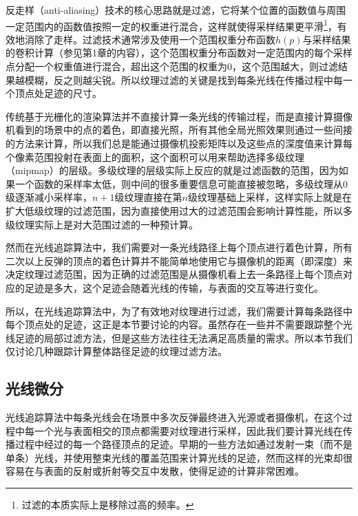 反走样（anti-aliasing）技术的核心思路就是过滤，它将某个位置的函数值与周围一定范围内的函数值按照一定的权重进行混合，这样就使得采样结果更平滑\footnote{过滤的本质实际上是移除过高的频率。}，有效地消除了走样。过滤技术通常涉及使用一个范围权重分布函数$h(p)$与采样结果的卷积计算（参见第1章的内容），这个范围权重分布函数对一定范围内的每个采样点分配一个权重值进行混合，超出这个范围的权重为0，这个范围越大，则过滤结果越模糊，反之则越尖锐。所以纹理过滤的关键是找到每条光线在传播过程中每一个顶点处足迹的尺寸。

传统基于光栅化的渲染算法并不直接计算一条光线的传输过程，而是直接计算摄像机看到的场景中的点的着色，即直接光照，所有其他全局光照效果则通过一些间接的方法来计算，所以我们总是能通过摄像机投影矩阵以及这些点的深度值来计算每个像素范围投射在表面上的面积，这个面积可以用来帮助选择多级纹理（mipmap）的层级。多级纹理的层级实际上反应的就是过滤函数的范围，因为如果一个函数的采样率太低，则中间的很多重要信息可能直接被忽略，多级纹理从$0$级逐渐减小采样率，$n+1$级纹理直接在第$n$级纹理基础上采样，这样实际上就是在扩大低级纹理的过滤范围，因为直接使用过大的过滤范围会影响计算性能，所以多级纹理实际上是对大范围过滤的一种预计算。

然而在光线追踪算法中，我们需要对一条光线路径上每个顶点进行着色计算，所有二次以上反弹的顶点的着色计算并不能简单地使用它与摄像机的距离（即深度）来决定纹理过滤范围，因为正确的过滤范围是从摄像机看上去一条路径上每个顶点对应的足迹是多大，这个足迹会随着光线的传输，与表面的交互等进行变化。

所以，在光线追踪算法中，为了有效地对纹理进行过滤，我们需要计算每条路径中每个顶点处的足迹，这正是本节要讨论的内容。虽然存在一些并不需要跟踪整个光线足迹的局部过滤方法，但是这些方法往往无法满足高质量的需求。所以本节我们仅讨论几种跟踪计算整体路径足迹的纹理过滤方法。






\subsection{光线微分}\label{sec:pt-ray-differentials}
光线追踪算法中每条光线会在场景中多次反弹最终进入光源或者摄像机，在这个过程中每一个光与表面相交的顶点都需要对纹理进行采样，因此我们要计算光线在传播过程中经过的每一个路径顶点的足迹。早期的一些方法如\cite{a:Beamtracingpolygonalobjects,a:RayTracingwithCones,a:Principlesandappli-cationsofpenciltracing}通过发射一束（而不是单条）光线，并使用整束光线的覆盖范围来计算光线的足迹，然而这样的光束却很容易在与表面的反射或折射等交互中发散，使得足迹的计算非常困难。

